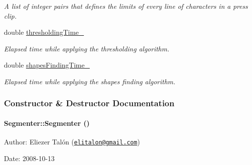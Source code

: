 \begin{CompactItemize}
\begin{CompactList}\small\item\em A list of integer pairs that defines the limits of every line of characters in a press clip. \item\end{CompactList}\item 
\hypertarget{class_segmenter_13c768c0dfa734bb6ca0c548511bc7bb}{
double \hyperlink{class_segmenter_13c768c0dfa734bb6ca0c548511bc7bb}{thresholdingTime\_\-}}
\label{class_segmenter_13c768c0dfa734bb6ca0c548511bc7bb}

\begin{CompactList}\small\item\em Elapsed time while applying the thresholding algorithm. \item\end{CompactList}\item 
\hypertarget{class_segmenter_ebe750333b882a982362ac18114ce915}{
double \hyperlink{class_segmenter_ebe750333b882a982362ac18114ce915}{shapesFindingTime\_\-}}
\label{class_segmenter_ebe750333b882a982362ac18114ce915}

\begin{CompactList}\small\item\em Elapsed time while applying the shapes finding algorithm. \item\end{CompactList}\end{CompactItemize}


\subsubsection{Constructor \& Destructor Documentation}
\hypertarget{class_segmenter_d39ec3bda31be180820aa0bdca7b125d}{
\paragraph[Segmenter]{\setlength{\rightskip}{0pt plus 5cm}Segmenter::Segmenter ()}\hfill}
\label{class_segmenter_d39ec3bda31be180820aa0bdca7b125d}


\begin{Desc}
\item[Author:]Eliezer Talón (\href{mailto:elitalon@gmail.com}{\tt elitalon@gmail.com}) \end{Desc}
\begin{Desc}
\item[Date:]2008-10-13 \end{Desc}


